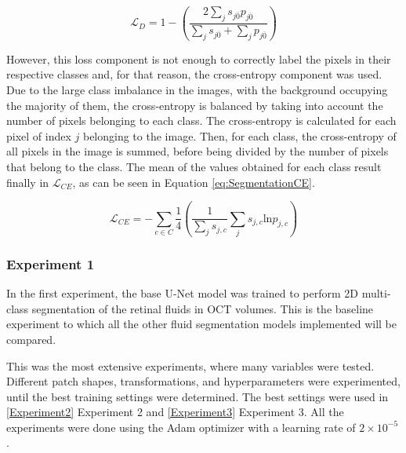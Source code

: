 \begin{equation}
	\mathcal{L}_{D} = 1 - \left( \frac{2 \sum_{j} s_{j\overline{0}} p_{j\overline{0}}}{\sum_{j} s_{j\overline{0}} + \sum_{j} p_{j\overline{0}}} \right)
	\label{eq:SegmentationDice}
\end{equation}

However, this loss component is not enough to correctly label the pixels in their respective classes and, for that reason, the cross-entropy component was used. Due to the large class imbalance in the images, with the background occupying the majority of them, the cross-entropy is balanced by taking into account the number of pixels belonging to each class. The cross-entropy is calculated for each pixel of index $j$ belonging to the image. Then, for each class, the cross-entropy of all pixels in the image is summed, before being divided by the number of pixels that belong to the class. The mean of the values obtained for each class result finally in $\mathcal{L}_{CE}$, as can be seen in Equation \ref{eq:SegmentationCE}.

\begin{equation}
	\mathcal{L}_{CE} = - \sum_{c \in C} \frac{1}{4}\left( \frac{1}{\sum_{j} s_{j,c}} \sum_{j} s_{j,c} \text{ln} p_{j,c} \right)
	\label{eq:SegmentationCE}
\end{equation}

\subsubsection{Experiment 1}
In the first experiment, the base U-Net model was trained to perform 2D multi-class segmentation of the retinal fluids in OCT volumes. This is the baseline experiment to which all the other fluid segmentation models implemented will be compared.
\par
This was the most extensive experiments, where many variables were tested. Different patch shapes, transformations, and hyperparameters were experimented, until the best training settings were determined. The best settings were used in \ref{Experiment2} Experiment 2 and \ref{Experiment3} Experiment 3. All the experiments were done using the Adam optimizer \parencite{Kingma2017} with a learning rate of $2 \times 10^{-5}$.

